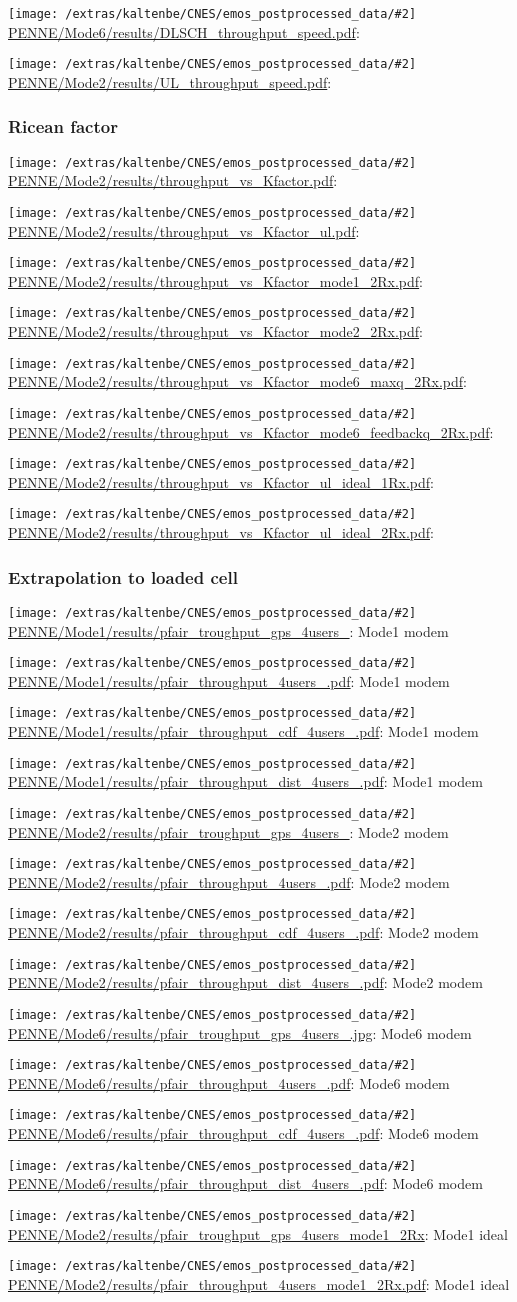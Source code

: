 \documentclass[a4paper,10pt]{article}
\newcommand{\printfile}[2][]{
 \begin{minipage}{8cm}
  \centering
  \texttt{[image: /extras/kaltenbe/CNES/emos\_postprocessed\_data/\#2]}
  \url{#2}: #1

 \end{minipage}
}
\begin{document}
\printfile{PENNE/Mode6/results/DLSCH_throughput_speed.pdf}
\printfile{PENNE/Mode2/results/UL_throughput_speed.pdf}

\subsubsection{Ricean factor}

\printfile{PENNE/Mode2/results/throughput_vs_Kfactor.pdf}
\printfile{PENNE/Mode2/results/throughput_vs_Kfactor_ul.pdf}

\printfile{PENNE/Mode2/results/throughput_vs_Kfactor_mode1_2Rx.pdf}
\printfile{PENNE/Mode2/results/throughput_vs_Kfactor_mode2_2Rx.pdf}

\printfile{PENNE/Mode2/results/throughput_vs_Kfactor_mode6_maxq_2Rx.pdf}
\printfile{PENNE/Mode2/results/throughput_vs_Kfactor_mode6_feedbackq_2Rx.pdf}

\printfile{PENNE/Mode2/results/throughput_vs_Kfactor_ul_ideal_1Rx.pdf}
\printfile{PENNE/Mode2/results/throughput_vs_Kfactor_ul_ideal_2Rx.pdf}



\subsubsection{Extrapolation to loaded cell}

\printfile[Mode1 modem]{PENNE/Mode1/results/pfair_troughput_gps_4users_}
\printfile[Mode1 modem]{PENNE/Mode1/results/pfair_throughput_4users_.pdf}

\printfile[Mode1 modem]{PENNE/Mode1/results/pfair_throughput_cdf_4users_.pdf}
\printfile[Mode1 modem]{PENNE/Mode1/results/pfair_throughput_dist_4users_.pdf}

\printfile[Mode2 modem]{PENNE/Mode2/results/pfair_troughput_gps_4users_}
\printfile[Mode2 modem]{PENNE/Mode2/results/pfair_throughput_4users_.pdf}

\printfile[Mode2 modem]{PENNE/Mode2/results/pfair_throughput_cdf_4users_.pdf}
\printfile[Mode2 modem]{PENNE/Mode2/results/pfair_throughput_dist_4users_.pdf}

\printfile[Mode6 modem]{PENNE/Mode6/results/pfair_troughput_gps_4users_.jpg}
\printfile[Mode6 modem]{PENNE/Mode6/results/pfair_throughput_4users_.pdf}

\printfile[Mode6 modem]{PENNE/Mode6/results/pfair_throughput_cdf_4users_.pdf}
\printfile[Mode6 modem]{PENNE/Mode6/results/pfair_throughput_dist_4users_.pdf}

\printfile[Mode1 ideal]{PENNE/Mode2/results/pfair_troughput_gps_4users_mode1_2Rx}
\printfile[Mode1 ideal]{PENNE/Mode2/results/pfair_throughput_4users_mode1_2Rx.pdf}
\end{document}
